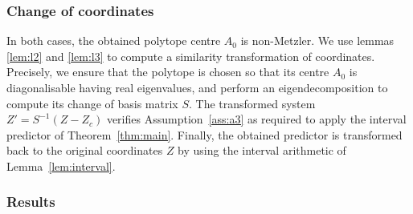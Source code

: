 \subsubsection{Change of coordinates}
In both cases, the obtained polytope centre $A_0$ is non-Metzler.
We use lemmas \ref{lem:l2} and \ref{lem:l3} to compute a similarity transformation of coordinates. Precisely, we ensure that the polytope is chosen so that its centre $A_0$ is diagonalisable having real eigenvalues, and perform an eigendecomposition to compute its change of basis matrix $S$. The transformed system $Z'=S^{-1}(Z-Z_c)$ verifies Assumption~\ref{ass:a3} as required to apply the interval predictor of Theorem~\ref{thm:main}. Finally, the obtained predictor is transformed back to the original coordinates $Z$ by using the interval arithmetic of Lemma~\ref{lem:interval}.

\subsubsection{Results}

